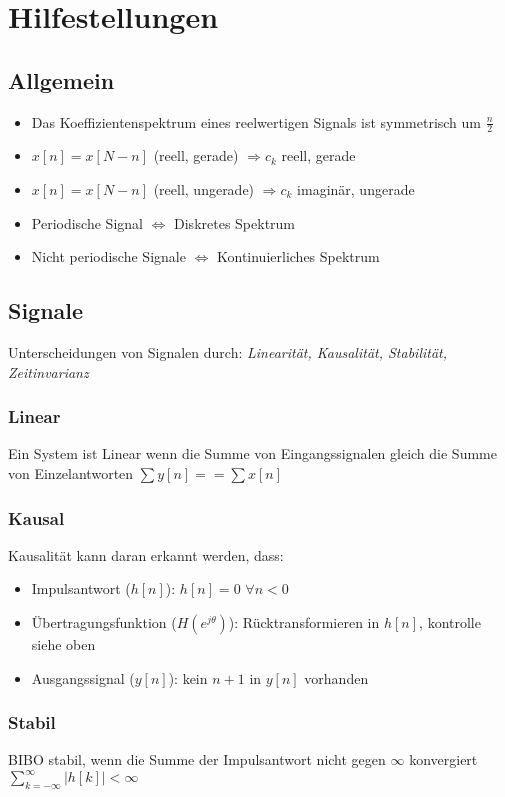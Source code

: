 \documentclass[a4paper, 12pt]{article}
\begin{document}
\section{Hilfestellungen}

\subsection{Allgemein}

\begin{itemize}
    \item Das Koeffizientenspektrum eines reelwertigen Signals ist symmetrisch um
          $\frac{n}{2}$
    \item $x[n] = x[N-n]$ (reell, gerade) $⇒c_k$ reell, gerade
    \item $x[n] = x[N-n]$ (reell, ungerade) $⇒c_k$ imaginär, ungerade
    \item Periodische Signal $⇔$ Diskretes Spektrum
    \item Nicht periodische Signale $⇔$ Kontinuierliches Spektrum
\end{itemize}

\subsection{Signale}
Unterscheidungen von Signalen durch: \textit{Linearität, Kausalität, Stabilität, Zeitinvarianz}
\subsubsection{Linear}
Ein System ist Linear wenn die Summe von Eingangssignalen gleich die Summe von Einzelantworten $ ∑ y[n] == ∑ x[n] $

\subsubsection{Kausal}
Kausalität kann daran erkannt werden, dass:
\begin{itemize}
  \item Impulsantwort ($h[n]$): $h[n]=0$ $\forall n<0$
  \item Übertragungsfunktion ($H(e^{j\theta})$): Rücktransformieren in $h[n]$, kontrolle siehe oben
  \item Ausgangssignal ($y[n]$): kein $n+1$ in $y[n]$ vorhanden
\end{itemize}

\subsubsection{Stabil}
BIBO stabil, wenn die Summe der Impulsantwort nicht gegen $\infty$ konvergiert
$\sum_{k=-\infty}^{\infty} |h[k]| < \infty$
\end{document}
